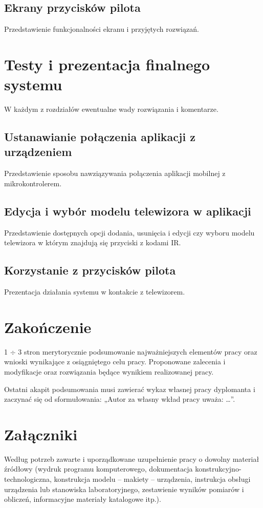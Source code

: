 \documentclass[12pt,twoside]{article}
\begin{document}
\subsection{Ekrany przycisków pilota}
Przedstawienie funkcjonalności ekranu i przyjętych rozwiązań.
\clearpage

\section{Testy i prezentacja finalnego systemu}
W każdym z rozdziałów ewentualne wady rozwiązania i komentarze.
\subsection{Ustanawianie połączenia aplikacji z urządzeniem}
Przedstawienie sposobu nawziązywania połączenia aplikacji mobilnej z mikrokontrolerem.
\subsection{Edycja i wybór modelu telewizora w aplikacji}
Przedstawienie dostępnych opcji dodania, usunięcia i edycji czy wyboru modelu telewizora w którym znajdują się przyciski z kodami IR.
\subsection{Korzystanie z przycisków pilota}
Prezentacja działania systemu w kontakcie z telewizorem.

\clearpage

\section{Zakończenie}

1 $\div$ 3 stron merytorycznie podsumowanie najważniejszych elementów pracy oraz wnioski wynikające z osiągniętego celu pracy. Proponowane zalecenia i modyfikacje oraz rozwiązania będące wynikiem realizowanej pracy.

Ostatni akapit podsumowania musi zawierać wykaz własnej pracy dyplomanta i zaczynać się od sformułowania: „Autor za własny wkład pracy uważa: \ldots”.

\clearpage

\section*{Załączniki}

Według potrzeb zawarte i uporządkowane uzupełnienie pracy o dowolny materiał źródłowy (wydruk programu komputerowego, dokumentacja kons\-truk\-cyj\-no-\-tech\-no\-lo\-gicz\-na, konstrukcja modelu -- makiety -- urządzenia, instrukcja obsługi urządzenia lub stanowiska laboratoryjnego, zestawienie wyników pomiarów i obliczeń, informacyjne materiały katalogowe itp.).
\end{document}
